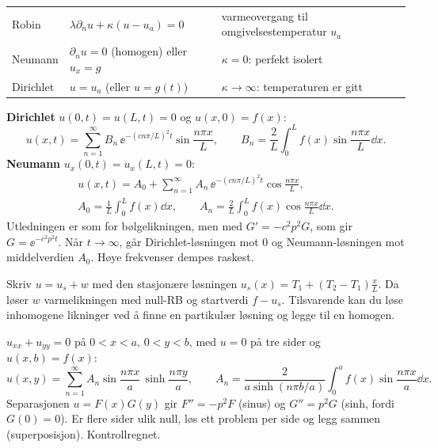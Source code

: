 \begin{defn}[randbetingelser]
\begin{tabular}{@{}lll@{}}
Robin & $\lambda\partial_nu+\kappa(u-u_a)=0$ & varmeovergang til omgivelsestemperatur $u_a$\\
Neumann & $\partial_nu=0$ (homogen) eller $u_x=g$ & $\kappa=0$: perfekt isolert\\
Dirichlet & $u=u_a$ (eller $u=g(t)$) & $\kappa\to\infty$: temperaturen er gitt
\end{tabular}
\end{defn}

\begin{formel}
\textbf{Dirichlet} $u(0,t)=u(L,t)=0$ og $u(x,0)=f(x)$:
\[
u(x,t)=\sum_{n=1}^\infty B_n\,\ee^{-(cn\pi/L)^2t}\sin\frac{n\pi x}L,\qquad B_n=\frac2L\int_0^Lf(x)\sin\frac{n\pi x}L\dd x .
\]
\textbf{Neumann} $u_x(0,t)=u_x(L,t)=0$:
\begin{gather*}
u(x,t)=A_0+\sum_{n=1}^\infty A_n\,\ee^{-(cn\pi/L)^2t}\cos\frac{n\pi x}L,\\
A_0=\frac1L\int_0^Lf(x)\dd x,\qquad A_n=\frac2L\int_0^Lf(x)\cos\frac{n\pi x}L\dd x .
\end{gather*}
Utledningen er som for bølgelikningen, men med $G'=-c^2p^2G$, som gir $G=\ee^{-c^2p^2t}$. Når $t\to\infty$, går Dirichlet-løsningen mot $0$ og Neumann-løsningen mot middelverdien $A_0$. Høye frekvenser dempes raskest.
\end{formel}
\begin{oppskrift}[konstante temperaturer $u(0,t)=T_1$, $u(L,t)=T_2$ (Kreyszig, ekstra)]
Skriv $u=u_s+w$ med den stasjonære løsningen $u_s(x)=T_1+(T_2-T_1)\frac xL$. Da løser $w$ varmelikningen med null-RB og startverdi $f-u_s$. Tilsvarende kan du løse inhomogene likninger ved å finne en partikulær løsning og legge til en homogen.
\end{oppskrift}

\begin{formel}
$u_{xx}+u_{yy}=0$ på $0<x<a$, $0<y<b$, med $u=0$ på tre sider og $u(x,b)=f(x)$:
\[
u(x,y)=\sum_{n=1}^\infty A_n\sin\frac{n\pi x}a\,\sinh\frac{n\pi y}a,\qquad A_n=\frac{2}{a\sinh(n\pi b/a)}\int_0^af(x)\sin\frac{n\pi x}a\dd x .
\]
Separasjonen $u=F(x)G(y)$ gir $F''=-p^2F$ (sinus) og $G''=p^2G$ (sinh, fordi $G(0)=0$). Er flere sider ulik null, løs ett problem per side og legg sammen (superposisjon). Kontrollregnet.
\end{formel}

